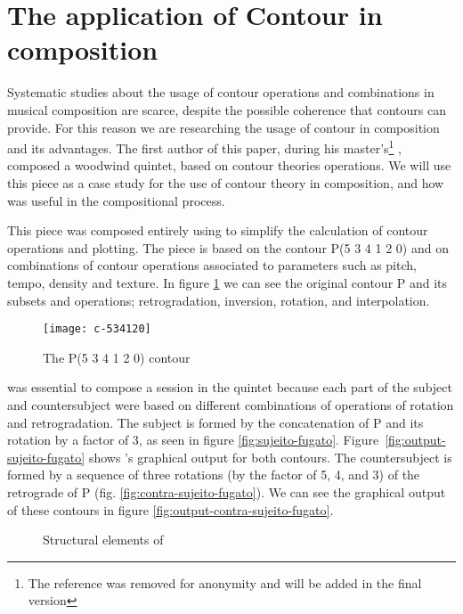\section{The application of Contour in composition}
\label{sec:cont-appl-comp}

Systematic studies about the usage of contour operations and
combinations in musical composition are scarce, despite the possible
coherence that contours can provide. For this reason we are
researching the usage of contour in composition and its advantages.
The first author of this paper, during his master's\footnote{The
  reference was removed for anonymity and will be added in the final
  version}
, composed a woodwind quintet, 
based on contour theories operations. We will use this piece as a case
study for the use of contour theory in composition, and how \goiaba{}
was useful in the compositional process.

This piece
was composed entirely using \goiaba{} to simplify the calculation of
contour operations and plotting. The piece is based on the contour P(5
3 4 1 2 0) and on combinations of contour operations associated to
parameters such as pitch, tempo, density and texture. In figure
\ref{fig:c-534120} we can see the original contour P and its subsets
and operations; retrogradation, inversion, rotation, and
interpolation.

\begin{figure}
  \centering
  \texttt{[image: c-534120]}
  \caption{The P(5 3 4 1 2 0) contour}
  \label{fig:c-534120}
\end{figure}

\goiaba{} was essential to compose a  session in the
quintet because each part of the subject and countersubject were based
on different combinations of operations of rotation and
retrogradation. The subject is formed by the concatenation of P and
its rotation by a factor of 3, as seen in figure
\ref{fig:sujeito-fugato}. Figure~\ref{fig:output-sujeito-fugato} shows
\goiaba{}'s graphical output for both contours. The countersubject is
formed by a sequence of three rotations (by the factor of 5, 4, and 3)
of the retrograde of P (fig. \ref{fig:contra-sujeito-fugato}). We can
see the graphical output of these contours in figure
\ref{fig:output-contra-sujeito-fugato}.

\begin{figure*}
  \centering

  \caption{Structural elements of }
  \label{fig:elementos-fugato}
\end{figure*}

